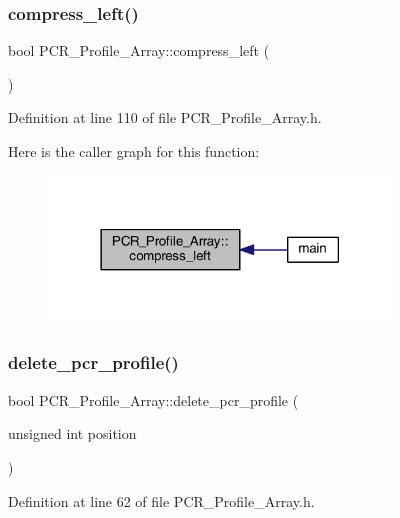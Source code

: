 \subsubsection{\texorpdfstring{compress\+\_\+left()}{compress\_left()}}
{\footnotesize\ttfamily bool P\+C\+R\+\_\+\+Profile\+\_\+\+Array\+::compress\+\_\+left (\begin{DoxyParamCaption}{ }\end{DoxyParamCaption})}



Definition at line 110 of file P\+C\+R\+\_\+\+Profile\+\_\+\+Array.\+h.

Here is the caller graph for this function\+:
\nopagebreak
\begin{figure}[H]
\begin{center}
\leavevmode
\includegraphics[width=258pt]{class_p_c_r___profile___array_af33c2dcfeb01b3cf9516e7a9c5515004_icgraph}
\end{center}
\end{figure}
\mbox{\label{class_p_c_r___profile___array_a4b1ef7c1dad3c7bd8705e742b3c7eae5}} 
\subsubsection{\texorpdfstring{delete\+\_\+pcr\+\_\+profile()}{delete\_pcr\_profile()}}
{\footnotesize\ttfamily bool P\+C\+R\+\_\+\+Profile\+\_\+\+Array\+::delete\+\_\+pcr\+\_\+profile (\begin{DoxyParamCaption}\item[{unsigned int}]{position }\end{DoxyParamCaption})}



Definition at line 62 of file P\+C\+R\+\_\+\+Profile\+\_\+\+Array.\+h.

